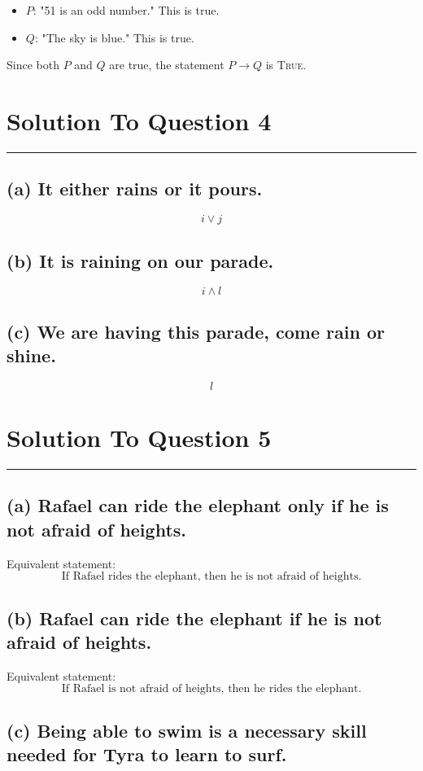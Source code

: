 \documentclass{article}
\begin{document}
\begin{itemize}
    \item \(P\): "51 is an odd number." This is true.
    \item \(Q\): "The sky is blue." This is true.
\end{itemize}

Since both \(P\) and \(Q\) are true, the statement \(P \rightarrow Q\) is \textsc{True}.
\newpage
\section*{Solution To Question 4}
\hrule
\subsection*{(a) It either rains or it pours.}
\[
i \lor j
\]

\subsection*{(b) It is raining on our parade.}
\[
i \land l
\]

\subsection*{(c) We are having this parade, come rain or shine.}
\[
l
\]

\section*{Solution To Question 5}
\hrule
\subsection*{(a) Rafael can ride the elephant only if he is not afraid of heights.}

Equivalent statement:
\[ \text{If Rafael rides the elephant, then he is not afraid of heights.} \]

\subsection*{(b) Rafael can ride the elephant if he is not afraid of heights.}

Equivalent statement:
\[ \text{If Rafael is not afraid of heights, then he rides the elephant.} \]

\subsection*{(c) Being able to swim is a necessary skill needed for Tyra to learn to surf.}
\end{document}
